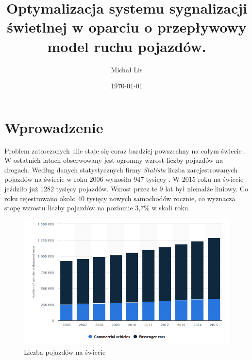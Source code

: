 \documentclass[12pt]{book}
\theoremstyle{plain}
\begin{document}
\title{Optymalizacja  systemu sygnalizacji świetlnej w 
oparciu o przepływowy model ruchu pojazdów.}
\author{Michał Lis}
\date{\today}
\maketitle
\tableofcontents
\chapter{Wprowadzenie}
Problem zatłoczonych ulic staje się coraz bardziej powszechny na całym świecie \cite{mobility_raport2019_col}. W ostatnich latach obserwowany jest ogromny wzrost liczby pojazdów na drogach.
Według danych statystycznych firmy \textit{Statista} liczba zarejestrowanych pojazdów na świecie w roku 2006 wynosiła 947 tysięcy \cite{liczbaPojazdowSwiat}. W 2015 roku na świecie jeździło już 1282 tysięcy pojazdów. Wzrost przez te 9 lat był niemalże liniowy. Co roku rejestrowano około 40 tysięcy nowych samochodów rocznie, co wyznacza stopę wzrostu liczby pojazdów na poziomie 3,7$\%$ w skali roku.
\begin{figure}[H]
  \centering
    \includegraphics[width=14cm]{liczbaPojazdowSwiat}
 \caption{Liczba pojazdów na świecie}
 \label{fig:liczbaPojazdowSwiat}
\end{figure} \noindent
\end{document}
